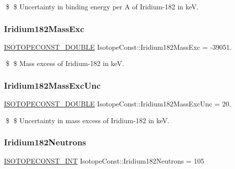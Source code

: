 \$ \$ Uncertainty in binding energy per A of Iridium-\/182 in keV. \mbox{\label{group___isotope_const-_iridium-_ir182_gacb118eef40e03bed976aadfe7d282056}} 
\subsubsection{\texorpdfstring{Iridium182\+Mass\+Exc}{Iridium182MassExc}}
{\footnotesize\ttfamily \mbox{\hyperlink{group___isotope_const-_macros_ga8f45a7272ce02c0b4c65c44636ed719a}{I\+S\+O\+T\+O\+P\+E\+C\+O\+N\+S\+T\+\_\+\+D\+O\+U\+B\+LE}} Isotope\+Const\+::\+Iridium182\+Mass\+Exc = -\/39051.}

\$ \$ Mass excess of Iridium-\/182 in keV. \mbox{\label{group___isotope_const-_iridium-_ir182_ga818229448a212a79c7c3234def8a715d}} 
\subsubsection{\texorpdfstring{Iridium182\+Mass\+Exc\+Unc}{Iridium182MassExcUnc}}
{\footnotesize\ttfamily \mbox{\hyperlink{group___isotope_const-_macros_ga8f45a7272ce02c0b4c65c44636ed719a}{I\+S\+O\+T\+O\+P\+E\+C\+O\+N\+S\+T\+\_\+\+D\+O\+U\+B\+LE}} Isotope\+Const\+::\+Iridium182\+Mass\+Exc\+Unc = 20.}

\$ \$ Uncertainty in mass excess of Iridium-\/182 in keV. \mbox{\label{group___isotope_const-_iridium-_ir182_gabb4e1b8047cf5df11a85dc624a50e36e}} 
\subsubsection{\texorpdfstring{Iridium182\+Neutrons}{Iridium182Neutrons}}
{\footnotesize\ttfamily \mbox{\hyperlink{group___isotope_const-_macros_ga5f18360b3e99483a35c32d789e62621c}{I\+S\+O\+T\+O\+P\+E\+C\+O\+N\+S\+T\+\_\+\+I\+NT}} Isotope\+Const\+::\+Iridium182\+Neutrons = 105}

